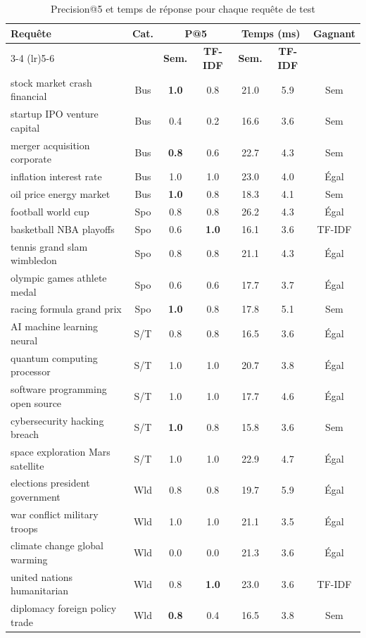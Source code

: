 \documentclass[12pt,a4paper]{article}
\begin{document}
\begin{table}[H]
\centering
\caption{Precision@5 et temps de r\'{e}ponse pour chaque requ\^{e}te de test}
\label{tab:perquery}
\footnotesize
\begin{tabular}{@{}p{4.8cm}cccccc@{}}
\toprule
\textbf{Requ\^{e}te} & \textbf{Cat.} & \multicolumn{2}{c}{\textbf{P@5}} & \multicolumn{2}{c}{\textbf{Temps (ms)}} & \textbf{Gagnant} \\
\cmidrule(lr){3-4} \cmidrule(lr){5-6}
 & & \textbf{Sem.} & \textbf{TF-IDF} & \textbf{Sem.} & \textbf{TF-IDF} & \\
\midrule
stock market crash financial       & Bus  & \textbf{1.0} & 0.8 & 21.0 & 5.9 & Sem \\
startup IPO venture capital        & Bus  & 0.4 & 0.2 & 16.6 & 3.6 & Sem \\
merger acquisition corporate       & Bus  & \textbf{0.8} & 0.6 & 22.7 & 4.3 & Sem \\
inflation interest rate            & Bus  & 1.0 & 1.0 & 23.0 & 4.0 & \'{E}gal \\
oil price energy market            & Bus  & \textbf{1.0} & 0.8 & 18.3 & 4.1 & Sem \\
\midrule
football world cup                 & Spo  & 0.8 & 0.8 & 26.2 & 4.3 & \'{E}gal \\
basketball NBA playoffs            & Spo  & 0.6 & \textbf{1.0} & 16.1 & 3.6 & TF-IDF \\
tennis grand slam wimbledon        & Spo  & 0.8 & 0.8 & 21.1 & 4.3 & \'{E}gal \\
olympic games athlete medal        & Spo  & 0.6 & 0.6 & 17.7 & 3.7 & \'{E}gal \\
racing formula grand prix          & Spo  & \textbf{1.0} & 0.8 & 17.8 & 5.1 & Sem \\
\midrule
AI machine learning neural         & S/T  & 0.8 & 0.8 & 16.5 & 3.6 & \'{E}gal \\
quantum computing processor        & S/T  & 1.0 & 1.0 & 20.7 & 3.8 & \'{E}gal \\
software programming open source   & S/T  & 1.0 & 1.0 & 17.7 & 4.6 & \'{E}gal \\
cybersecurity hacking breach       & S/T  & \textbf{1.0} & 0.8 & 15.8 & 3.6 & Sem \\
space exploration Mars satellite   & S/T  & 1.0 & 1.0 & 22.9 & 4.7 & \'{E}gal \\
\midrule
elections president government     & Wld  & 0.8 & 0.8 & 19.7 & 5.9 & \'{E}gal \\
war conflict military troops       & Wld  & 1.0 & 1.0 & 21.1 & 3.5 & \'{E}gal \\
climate change global warming      & Wld  & 0.0 & 0.0 & 21.3 & 3.6 & \'{E}gal \\
united nations humanitarian        & Wld  & 0.8 & \textbf{1.0} & 23.0 & 3.6 & TF-IDF \\
diplomacy foreign policy trade     & Wld  & \textbf{0.8} & 0.4 & 16.5 & 3.8 & Sem \\
\bottomrule
\end{tabular}
\end{table}
\end{document}
